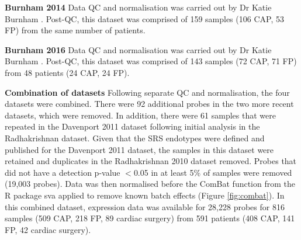 \textbf{Burnham 2014}
Data QC and normalisation was carried out by Dr Katie Burnham \parencite{Burnham2017}. Post-QC, this dataset was comprised of 159 samples (106 CAP, 53 FP) from the same number of patients.

\textbf{Burnham 2016}
Data QC and normalisation was carried out by Dr Katie Burnham \parencite{Burnham2017}. Post-QC, this dataset was comprised of 143 samples (72 CAP, 71 FP) from 48 patients (24 CAP, 24 FP).

\textbf{Combination of datasets}
Following separate QC and normalisation, the four datasets were combined. There were 92 additional probes in the two more recent datasets, which were removed. In addition, there were 61 samples that were repeated in the Davenport 2011 dataset following initial analysis in the Radhakrishnan dataset. Given that the SRS endotypes were defined and published for the Davenport 2011 dataset, the samples in this dataset were retained and duplicates in the Radhakrishnan 2010 dataset removed. Probes that did not have a detection p-value $<$0.05 in at least 5\% of samples were removed (19,003 probes). Data was then normalised before the ComBat function from the R package sva applied to remove known batch effects (Figure \ref{fig:combat}). In this combined dataset, expression data was available for 28,228 probes for 816 samples (509 CAP, 218 FP, 89 cardiac surgery) from 591 patients (408 CAP, 141 FP, 42 cardiac surgery).

